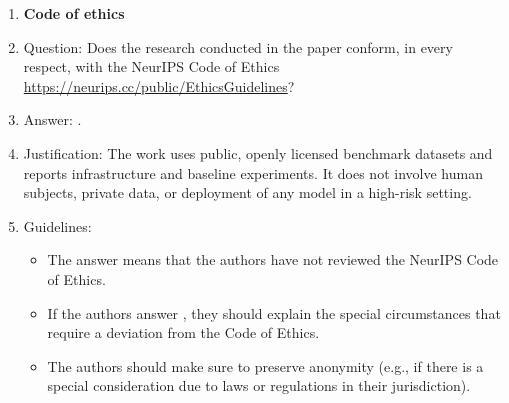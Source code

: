 \begin{enumerate}
\item {\bf Code of ethics}
    \item[] Question: Does the research conducted in the paper conform, in every respect, with the NeurIPS Code of Ethics \url{https://neurips.cc/public/EthicsGuidelines}?
    \item[] Answer: \answerYes{}.
    \item[] Justification: The work uses public, openly licensed benchmark datasets and reports infrastructure and baseline experiments. It does not involve human subjects, private data, or deployment of any model in a high-risk setting.
    \item[] Guidelines:
    \begin{itemize}
        \item The answer \answerNA{} means that the authors have not reviewed the NeurIPS Code of Ethics.
        \item If the authors answer \answerNo, they should explain the special circumstances that require a deviation from the Code of Ethics.
        \item The authors should make sure to preserve anonymity (e.g., if there is a special consideration due to laws or regulations in their jurisdiction).
    \end{itemize}



\end{enumerate}
